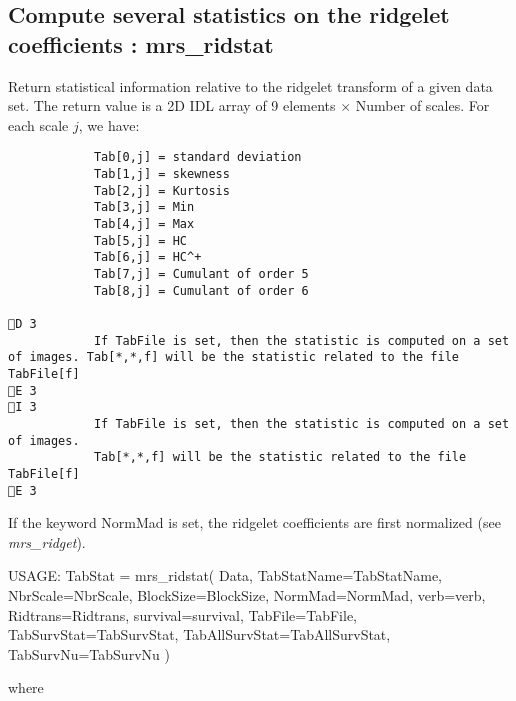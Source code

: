 \subsection{Compute several statistics on the ridgelet coefficients : mrs\_ridstat}
Return statistical information relative to the ridgelet transform of a given data set. The return value is a 2D IDL array 
of 9 elements $\times$ Number of scales. For each scale $j$, we have:
\begin{verbatim}
			Tab[0,j] = standard deviation
			Tab[1,j] = skewness
			Tab[2,j] = Kurtosis
			Tab[3,j] = Min
			Tab[4,j] = Max 
			Tab[5,j] = HC
			Tab[6,j] = HC^+
			Tab[7,j] = Cumulant of order 5
			Tab[8,j] = Cumulant of order 6
			
D 3
			If TabFile is set, then the statistic is computed on a set of images. Tab[*,*,f] will be the statistic related to the file TabFile[f]
E 3
I 3
			If TabFile is set, then the statistic is computed on a set of images.
			Tab[*,*,f] will be the statistic related to the file TabFile[f]
E 3

\end{verbatim}
If the keyword NormMad is set, the ridgelet coefficients are first normalized (see {\em mrs\_ridget}).
{\bf
\begin{center}
     USAGE: TabStat = mrs\_ridstat( Data, TabStatName=TabStatName, NbrScale=NbrScale, BlockSize=BlockSize, NormMad=NormMad, verb=verb, 
     Ridtrans=Ridtrans, survival=survival, TabFile=TabFile, TabSurvStat=TabSurvStat, TabAllSurvStat=TabAllSurvStat, TabSurvNu=TabSurvNu )  
\end{center}}
where 
